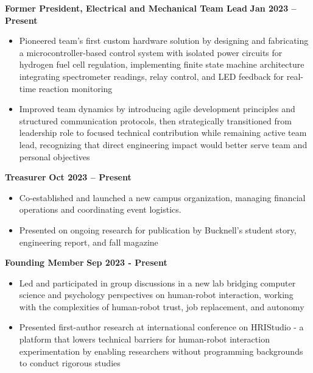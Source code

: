 \documentclass{article}
\begin{document}

 \hfill {}

\textbf{Former President, Electrical and Mechanical Team Lead} \hfill \textbf{Jan 2023 – Present}
\begin{itemize}[noitemsep,topsep=2pt]
	\item Pioneered team's first custom hardware solution by designing and fabricating a microcontroller-based control system with isolated power circuits for hydrogen fuel cell regulation, implementing finite state machine architecture integrating spectrometer readings, relay control, and LED feedback for real-time reaction monitoring
    \item Improved team dynamics by introducing agile development principles and structured communication protocols, then strategically transitioned from leadership role to focused technical contribution while remaining active team lead, recognizing that direct engineering impact would better serve team and personal objectives
\end{itemize}

 \hfill {}

\textbf{Treasurer} \hfill \textbf{Oct 2023 – Present}
\begin{itemize}[noitemsep,topsep=2pt]
    \item Co-established and launched a new campus organization, managing financial operations and coordinating event logistics.
    \item Presented on ongoing research for publication by Bucknell's student story, engineering report, and fall magazine
\end{itemize}

 \hfill {}

\textbf{Founding Member} \hfill \textbf{Sep 2023 - Present}
\begin{itemize}[noitemsep,topsep=2pt]
	\item Led and participated in group discussions in a new lab bridging computer science and psychology perspectives on human-robot interaction, working with the complexities of human-robot trust, job replacement, and autonomy
\end{itemize}


 \hfill {}
\begin{itemize}[noitemsep,topsep=2pt]
    \item Presented first-author research at international conference on HRIStudio - a platform that lowers technical barriers for human-robot interaction experimentation by enabling researchers without programming backgrounds to conduct rigorous studies
\end{itemize}
\end{document}
